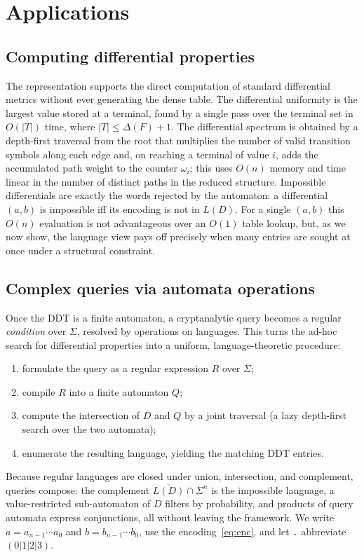 \documentclass[runningheads]{llncs}
\newcommand{\Sig}{\Sigma}
\newcommand{\re}[1]{\texttt{#1}}
\begin{document}
\section{Applications}
\label{sec:applications}

\subsection{Computing differential properties}

The representation supports the direct computation of standard differential
metrics without ever generating the dense table. The differential uniformity is
the largest value stored at a terminal, found by a single pass over the terminal
set in $O(|T|)$ time, where $|T|\le\Delta(F)+1$. The differential spectrum is
obtained by a depth-first traversal from the root that multiplies the number of
valid transition symbols along each edge and, on reaching a terminal of value
$i$, adds the accumulated path weight to the counter $\omega_i$; this uses $O(n)$
memory and time linear in the number of distinct paths in the reduced structure.
Impossible differentials are exactly the words rejected by the automaton: a
differential $(a,b)$ is impossible iff its encoding is not in $L(D)$. For a single
$(a,b)$ this $O(n)$ evaluation is not advantageous over an $O(1)$ table lookup,
but, as we now show, the language view pays off precisely when many entries are
sought at once under a structural constraint.

\subsection{Complex queries via automata operations}
\label{sec:queries}

Once the DDT is a finite automaton, a cryptanalytic query becomes a regular
\emph{condition} over $\Sig$, resolved by operations on languages. This turns the
ad-hoc search for differential properties into a uniform, language-theoretic
procedure:
\begin{enumerate}
  \item formulate the query as a regular expression $R$ over $\Sig$;
  \item compile $R$ into a finite automaton $Q$;
  \item compute the intersection of $D$ and $Q$ by a joint traversal (a lazy
        depth-first search over the two automata);
  \item enumerate the resulting language, yielding the matching DDT entries.
\end{enumerate}
Because regular languages are closed under union, intersection, and complement,
queries compose: the complement $\overline{L(D)}\cap\Sig^{n}$ is the impossible
language, a value-restricted sub-automaton of $D$ filters by probability, and
products of query automata express conjunctions, all without leaving the
framework. We write $a=a_{n-1}\cdots a_0$ and $b=b_{n-1}\cdots b_0$, use the
encoding~\eqref{eq:enc}, and let \re{.} abbreviate $(0|1|2|3)$.
\end{document}
